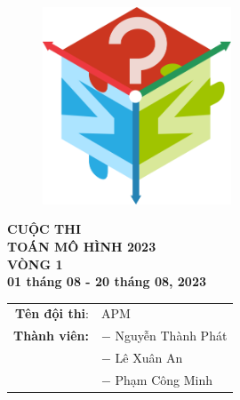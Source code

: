 \documentclass[12pt]{report}
\begin{document}
\thispagestyle{empty}


\begin{titlepage}
	\begin{figure}[h]
		\centering
		\includegraphics[width=0.5\textwidth]{images/logotmh.png}
	\end{figure}

	\begin{center}
		\textbf{{\Huge CUỘC THI}} \\[10pt]
		\textbf{\LARGE TOÁN MÔ HÌNH 2023}\\[10pt]
		\textbf{\LARGE VÒNG 1}\\[10pt]
		\textbf{ 01 tháng 08  - 20 tháng 08, 2023}
		\\[3.0cm]


		\begin{tabular}{r l}
			\textbf{Tên đội thi}: &APM \\
			\textbf{Thành viên:}
				&$-$ Nguyễn Thành Phát \\
				&$-$ Lê Xuân An \\
				&$-$ Phạm Công Minh
		\end{tabular}
	\end{center}

	\vspace{\fill}
\end{titlepage}

\newpage
\end{document}
